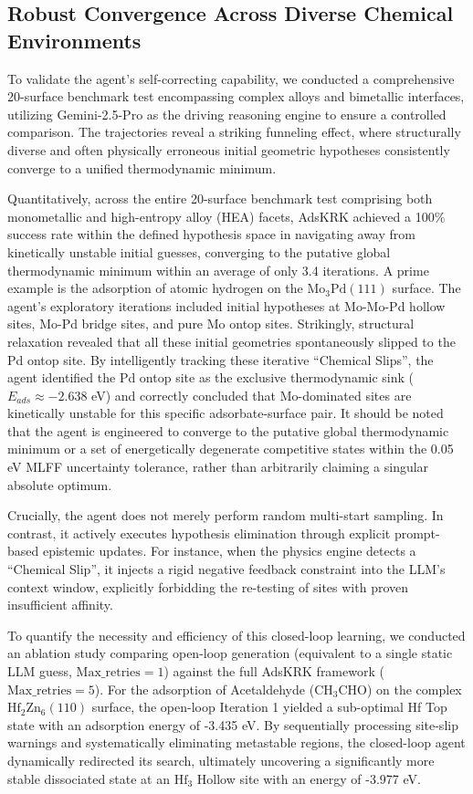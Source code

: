 \documentclass{article}
\begin{document}
\subsection{Robust Convergence Across Diverse Chemical Environments}
To validate the agent's self-correcting capability, we conducted a comprehensive 20-surface benchmark test encompassing complex alloys and bimetallic interfaces, utilizing Gemini-2.5-Pro as the driving reasoning engine to ensure a controlled comparison. The trajectories reveal a striking funneling effect, where structurally diverse and often physically erroneous initial geometric hypotheses consistently converge to a unified thermodynamic minimum.

Quantitatively, across the entire 20-surface benchmark test comprising both monometallic and high-entropy alloy (HEA) facets, AdsKRK achieved a 100\% success rate within the defined hypothesis space in navigating away from kinetically unstable initial guesses, converging to the putative global thermodynamic minimum within an average of only 3.4 iterations. A prime example is the adsorption of atomic hydrogen on the $\text{Mo}_{3}\text{Pd}(111)$ surface. The agent's exploratory iterations included initial hypotheses at Mo-Mo-Pd hollow sites, Mo-Pd bridge sites, and pure Mo ontop sites. Strikingly, structural relaxation revealed that all these initial geometries spontaneously slipped to the Pd ontop site. By intelligently tracking these iterative ``Chemical Slips'', the agent identified the Pd ontop site as the exclusive thermodynamic sink ($E_{ads} \approx -2.638$ eV) and correctly concluded that Mo-dominated sites are kinetically unstable for this specific adsorbate-surface pair. It should be noted that the agent is engineered to converge to the putative global thermodynamic minimum or a set of energetically degenerate competitive states within the 0.05 eV MLFF uncertainty tolerance, rather than arbitrarily claiming a singular absolute optimum.

Crucially, the agent does not merely perform random multi-start sampling. In contrast, it actively executes hypothesis elimination through explicit prompt-based epistemic updates. For instance, when the physics engine detects a ``Chemical Slip'', it injects a rigid negative feedback constraint into the LLM's context window, explicitly forbidding the re-testing of sites with proven insufficient affinity.

To quantify the necessity and efficiency of this closed-loop learning, we conducted an ablation study comparing open-loop generation (equivalent to a single static LLM guess, $\text{Max\_retries} = 1$) against the full AdsKRK framework ($\text{Max\_retries} = 5$). For the adsorption of Acetaldehyde ($\text{CH}_{3}\text{CHO}$) on the complex $\text{Hf}_{2}\text{Zn}_{6}(110)$ surface, the open-loop Iteration 1 yielded a sub-optimal Hf Top state with an adsorption energy of -3.435 eV. By sequentially processing site-slip warnings and systematically eliminating metastable regions, the closed-loop agent dynamically redirected its search, ultimately uncovering a significantly more stable dissociated state at an $\text{Hf}_{3}$ Hollow site with an energy of -3.977 eV.
\end{document}
